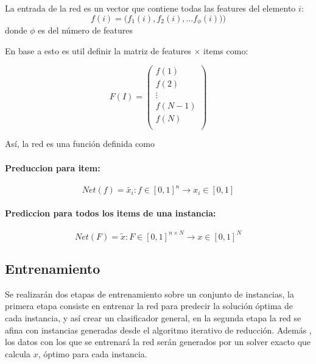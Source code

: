 \documentclass[spanish, a4paper, 12pt, twoside, openany,final]{book}
\numberwithin{equation}{section}
\begin{document}
La entrada de la red es un vector que contiene todas las features del elemento $i$:
$$
	f(i) = \textbf{(}f_1(i),f_2(i), \hdots f_\phi(i))\textbf{)}
$$
donde $\phi$ es del número de features

En base a esto es util definir la matriz de features $\times$ items como:

\begin{equation}
F(I) = 
\left( 
\begin{matrix}
	f(1)\\
	f(2)\\
	\vdots \\
	f(N-1)\\
	f(N)\\
\end{matrix}
\right)
\end{equation}





Así, la red es una función definida como
\paragraph*{Preduccion para item:}
$$
	Net(f) = \tilde{x_i}: f\in [0,1]^n \rightarrow x_i \in[0,1]
$$

\paragraph*{Prediccion para todos los items de una instancia:}

$$
	Net(F) = \tilde{x}: F\in [0,1]^{n\times N} \rightarrow x \in[0,1]^{N}
$$


\subsection{Entrenamiento}

Se realizarán dos etapas de entrenamiento sobre un conjunto de instancias, la primera etapa consiste en entrenar la red para predecir la solución óptima de cada instancia, y así crear un clasificador general, en la segunda etapa la red se afina con instancias generadas desde el algoritmo iterativo de reducción. Además , los datos con los que se entrenará la red serán generados por un solver exacto que calcula $x$, óptimo para cada instancia. 
\end{document}

